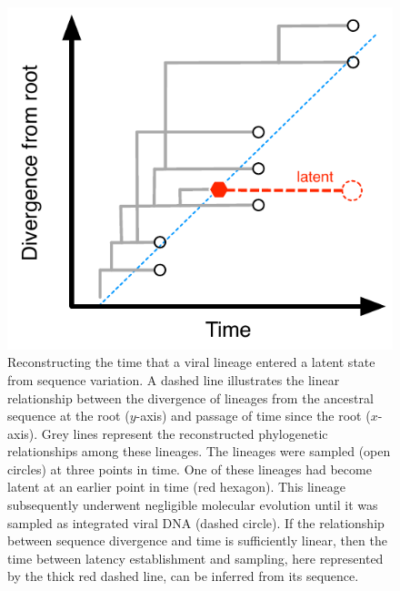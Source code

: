 \documentclass[12pt]{article}
\begin{document}







\begin{figure}[p]
	\centering
	\includegraphics{figures/latency-scheme}
	\caption[Latency Scheme]{
	{Reconstructing the time that a viral lineage entered a latent state from sequence variation.}
	A dashed line illustrates the linear relationship between the divergence of lineages from the ancestral sequence at the root ($y$-axis) and passage of time since the root ($x$-axis).
	Grey lines represent the reconstructed phylogenetic relationships among these lineages.
	The lineages were sampled (open circles) at three points in time.
	One of these lineages had become latent at an earlier point in time (red hexagon).
	This lineage subsequently underwent negligible molecular evolution until it was sampled as integrated viral DNA (dashed circle).
	If the relationship between sequence divergence and time is sufficiently linear, then the time between latency establishment and sampling, here represented by the thick red dashed line, can be inferred from its sequence.
	}
	\label{fig:latenttree}
\end{figure}
\end{document}

